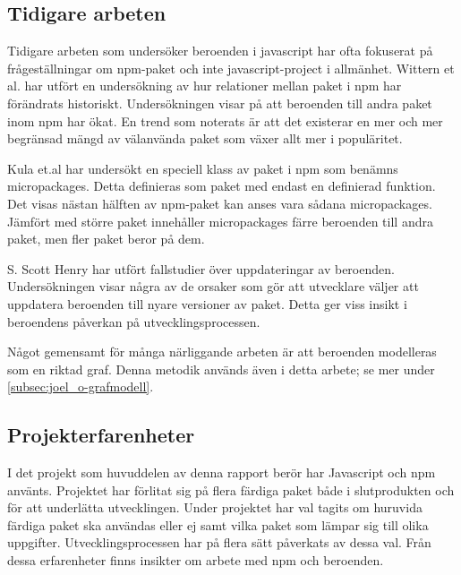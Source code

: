 \subsection{Tidigare arbeten}
Tidigare arbeten som undersöker beroenden i javascript har ofta fokuserat på frågeställningar om npm-paket och inte javascript-project i allmänhet. Wittern et al. har utfört en undersökning av hur relationer mellan paket i npm har förändrats historiskt.\cite{Wittern:2016} Undersökningen visar på att beroenden till andra paket inom npm har ökat. En trend som noterats är att det existerar en mer och mer begränsad mängd av välanvända paket som växer allt mer i populäritet.

Kula et.al har undersökt en speciell klass av paket i npm som benämns micropackages.\cite{Kula2017} Detta definieras som paket med endast en definierad funktion. Det visas nästan hälften av npm-paket kan anses vara sådana micropackages. Jämfört med större paket innehåller micropackages färre beroenden till andra paket, men fler paket beror på dem.

S. Scott Henry har utfört fallstudier över uppdateringar av beroenden.\cite{Henry2017} Undersökningen visar några av de orsaker som gör att utvecklare väljer att uppdatera beroenden till nyare versioner av paket. Detta ger viss insikt i beroendens påverkan på utvecklingsprocessen.

Något gemensamt för många närliggande arbeten är att beroenden modelleras som en riktad graf. Denna metodik används även i detta arbete; se mer under \ref{subsec:joel_o-grafmodell}.

\subsection{Projekterfarenheter}
I det projekt som huvuddelen av denna rapport berör har Javascript och npm använts. Projektet har förlitat sig på flera färdiga paket både i slutprodukten och för att underlätta utvecklingen. Under projektet har val tagits om huruvida färdiga paket ska användas eller ej samt vilka paket som lämpar sig till olika uppgifter. Utvecklingsprocessen har på flera sätt påverkats av dessa val. Från dessa erfarenheter finns insikter om arbete med npm och beroenden.
